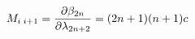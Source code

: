 \begin{equation}
M_{i\;i+1}={\partial\beta_{2n}\over\partial\lambda_{2n+2}}=
(2n+1)(n+1) c
\end{equation}

